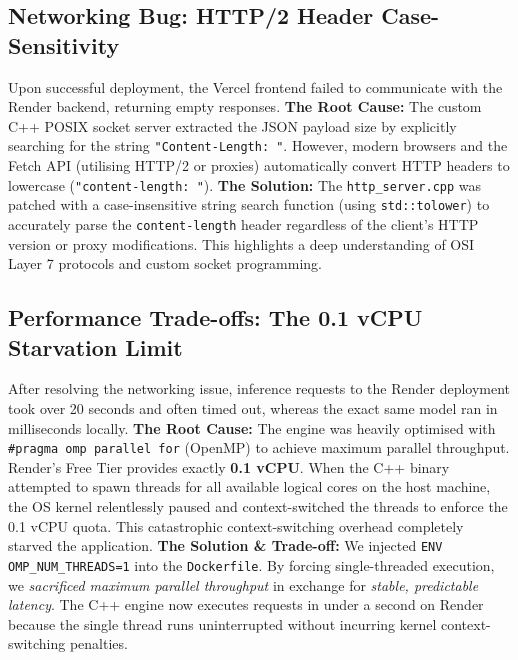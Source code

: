 \documentclass[12pt, a4paper]{article}
\begin{document}
\subsection{Networking Bug: HTTP/2 Header Case-Sensitivity}
Upon successful deployment, the Vercel frontend failed to communicate with the Render backend, returning empty responses. 
\newline\newline
\textbf{The Root Cause:} The custom C++ POSIX socket server extracted the JSON payload size by explicitly searching for the string \texttt{"Content-Length: "}. However, modern browsers and the Fetch API (utilising HTTP/2 or proxies) automatically convert HTTP headers to lowercase (\texttt{"content-length: "}).
\newline\newline
\textbf{The Solution:} The \texttt{http\_server.cpp} was patched with a case-insensitive string search function (using \texttt{std::tolower}) to accurately parse the \texttt{content-length} header regardless of the client's HTTP version or proxy modifications. This highlights a deep understanding of OSI Layer 7 protocols and custom socket programming.

\subsection{Performance Trade-offs: The 0.1 vCPU Starvation Limit}
After resolving the networking issue, inference requests to the Render deployment took over 20 seconds and often timed out, whereas the exact same model ran in milliseconds locally.
\newline\newline
\textbf{The Root Cause:} The engine was heavily optimised with \texttt{\#pragma omp parallel for} (OpenMP) to achieve maximum parallel throughput. Render's Free Tier provides exactly \textbf{0.1 vCPU}. When the C++ binary attempted to spawn threads for all available logical cores on the host machine, the OS kernel relentlessly paused and context-switched the threads to enforce the 0.1 vCPU quota. This catastrophic context-switching overhead completely starved the application.
\newline\newline
\textbf{The Solution \& Trade-off:} We injected \texttt{ENV OMP\_NUM\_THREADS=1} into the \texttt{Dockerfile}. 
\newline
By forcing single-threaded execution, we \textit{sacrificed maximum parallel throughput} in exchange for \textit{stable, predictable latency}. The C++ engine now executes requests in under a second on Render because the single thread runs uninterrupted without incurring kernel context-switching penalties.
\end{document}
